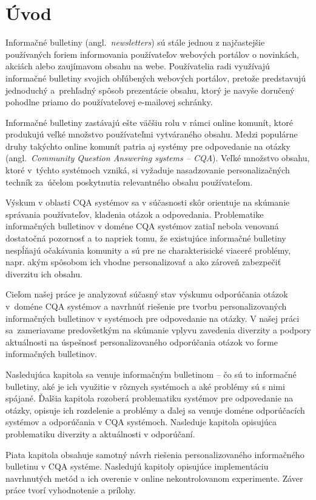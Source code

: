 \afterpage{\blankpage}
\newpage
\chapter{Úvod}

Informačné bulletiny (angl.~\emph{newsletters}) sú stále jednou z najčastejšie používaných foriem informovania používateľov
webových portálov o novinkách, akciách alebo zaujímavom obsahu na webe. Používatelia radi využívajú informačné bulletiny
svojich obľúbených webových portálov, pretože predstavujú jednoduchý a~prehľadný spôsob prezentácie obsahu, ktorý je navyše
doručený pohodlne priamo do používateľovej e-mailovej schránky.

Informačné bulletiny zastávajú ešte väčšiu rolu v rámci online komunít, ktoré produkujú veľké množstvo používateľmi
vytváraného obsahu. Medzi populárne druhy takýchto online komunít patria aj systémy pre odpovedanie na otázky
(angl.~\emph{Community Question Answering systems -- CQA}). Veľké množstvo obsahu, ktoré v~týchto systémoch vzniká,
si vyžaduje nasadzovanie personalizačných techník za~účelom poskytnutia relevantného obsahu používateľom.

Výskum v oblasti CQA systémov sa v súčasnosti skôr orientuje na skúmanie správania používateľov, kladenia otázok a odpovedania.
Problematike informačných bulletinov v doméne CQA systémov zatiaľ nebola venovaná dostatočná pozornosť a to napriek tomu,
že existujúce informačné bulletiny nespĺňajú očakávania komunity a sú pre ne charakterisické viaceré problémy, napr.
akým spôsobom ich vhodne personalizovať a ako zároveň zabezpečiť diverzitu ich obsahu.

Cieľom našej práce je analyzovať súčasný stav výskumu odporúčania otázok v~doméne CQA systémov a navrhnúť riešenie pre
tvorbu personalizovaných informačných bulletinov v systémoch pre odpovedanie na otázky. V našej práci sa~zameriavame
predovšetkým na skúmanie vplyvu zavedenia diverzity a podpory aktuálnosti na úspešnosť personalizovaného odporúčania
otázok vo forme informačných bulletinov.

Nasledujúca kapitola sa venuje informačným bulletinom -- čo sú to informačné bulletiny, aké je ich využitie v rôznych
systémoch a aké problémy sú s nimi spájané. Ďalšia kapitola rozoberá problematiku systémov pre odpovedanie na otázky,
opisuje ich rozdelenie a problémy a ďalej sa venuje doméne odporúčacích systémov a odporúčania v CQA systémoch.
Nasleduje kapitola opisujúca problematiku diverzity a aktuálnosti v odporúčaní.

Piata kapitola obsahuje samotný návrh riešenia personalizovaného informačného bulletinu v CQA systéme. Nasledujú kapitoly
opisujúce implementáciu navrhnutých metód a ich overenie v online nekontrolovanom experimente. Záver práce tvorí vyhodnotenie
a prílohy.
